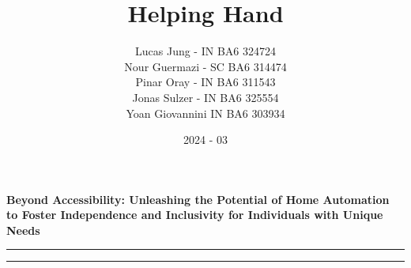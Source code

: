 \documentclass[12pt, a4paper, openany]{article}
\title{Helping Hand}
\author{Lucas Jung - IN BA6 324724\\Nour Guermazi - SC BA6 314474\\Pinar Oray - IN BA6 311543\\Jonas Sulzer - IN BA6 325554\\Yoan Giovannini IN BA6 303934}
\date{2024 - 03}
\begin{document}
\maketitle
\thispagestyle{fancy}

\begin{center}
    \textbf{Beyond Accessibility: Unleashing the Potential of Home Automation to Foster Independence and Inclusivity for Individuals with Unique Needs}
\end{center}

\par\noindent\rule{\textwidth}{0.4pt}
\vspace{-20pt}
\tableofcontents
\par\noindent\rule{\textwidth}{0.4pt}

\vspace{10pt}




\end{document}
